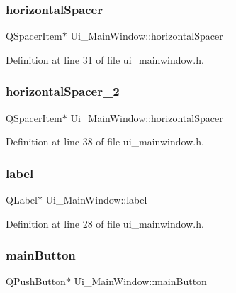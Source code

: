 \subsubsection{\texorpdfstring{horizontalSpacer}{horizontalSpacer}}
{\footnotesize\ttfamily Q\+Spacer\+Item$\ast$ Ui\+\_\+\+Main\+Window\+::horizontal\+Spacer}



Definition at line 31 of file ui\+\_\+mainwindow.\+h.

\mbox{\label{class_ui___main_window_a9a022556cf8ce3fa47e51d79cb222ab0}} 
\subsubsection{\texorpdfstring{horizontalSpacer\_2}{horizontalSpacer\_2}}
{\footnotesize\ttfamily Q\+Spacer\+Item$\ast$ Ui\+\_\+\+Main\+Window\+::horizontal\+Spacer\+\_}



Definition at line 38 of file ui\+\_\+mainwindow.\+h.

\mbox{\label{class_ui___main_window_ad9c89133780f28e6efa2ec17ceb9cff5}} 
\subsubsection{\texorpdfstring{label}{label}}
{\footnotesize\ttfamily Q\+Label$\ast$ Ui\+\_\+\+Main\+Window\+::label}



Definition at line 28 of file ui\+\_\+mainwindow.\+h.

\mbox{\label{class_ui___main_window_a5c315d3186a5bca7e7d71fb3c41057b3}} 
\subsubsection{\texorpdfstring{mainButton}{mainButton}}
{\footnotesize\ttfamily Q\+Push\+Button$\ast$ Ui\+\_\+\+Main\+Window\+::main\+Button}



